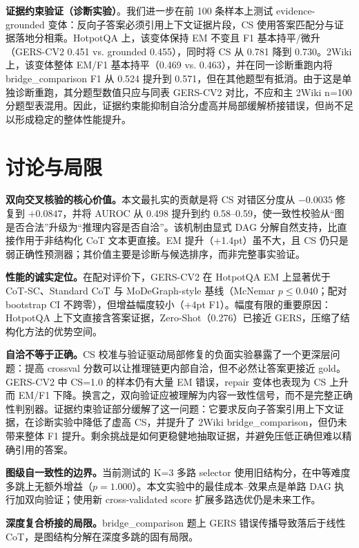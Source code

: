 \documentclass[11pt,a4paper]{ctexart}
\begin{document}
\textbf{证据约束验证（诊断实验）}。我们进一步在前 100 条样本上测试 evidence-grounded 变体：反向子答案必须引用上下文证据片段，CS 使用答案匹配分与证据落地分相乘。HotpotQA 上，该变体保持 EM 不变且 F1 基本持平/微升（GERS-CV2 0.451 vs. grounded 0.455），同时将 CS 从 0.781 降到 0.730。2Wiki 上，该变体整体 EM/F1 基本持平（0.469 vs. 0.463），并在同一诊断重跑内将 bridge\_comparison F1 从 0.524 提升到 0.571，但在其他题型有抵消。由于这是单独诊断重跑，其分题型数值只应与同表 GERS-CV2 对比，不应和主 2Wiki n=100 分题型表混用。因此，证据约束能抑制自洽分虚高并局部缓解桥接错误，但尚不足以形成稳定的整体性能提升。

\section{讨论与局限}

\textbf{双向交叉核验的核心价值。}本文最扎实的贡献是将 CS 对错区分度从 $-0.0035$ 修复到 $+0.0847$，并将 AUROC 从 0.498 提升到约 0.58--0.59，使一致性校验从``图是否合法''升级为``推理内容是否自洽''。该机制由显式 DAG 分解自然支持，比直接作用于非结构化 CoT 文本更直接。EM 提升（+1.4pt）虽不大，且 CS 仍只是弱正确性预测器；其价值主要是诊断与候选排序，而非完整事实验证。

\textbf{性能的诚实定位。}在配对评价下，GERS-CV2 在 HotpotQA EM 上显著优于 CoT-SC、Standard CoT 与 MoDeGraph-style 基线（McNemar $p\le0.040$；配对 bootstrap CI 不跨零），但增益幅度较小（+4pt F1）。幅度有限的重要原因：HotpotQA 上下文直接含答案证据，Zero-Shot（0.276）已接近 GERS，压缩了结构化方法的优势空间。

\textbf{自洽不等于正确。}CS 校准与验证驱动局部修复的负面实验暴露了一个更深层问题：提高 crossval 分数可以让推理链更内部自洽，但不必然让答案更接近 gold。GERS-CV2 中 CS=1.0 的样本仍有大量 EM 错误，repair 变体也表现为 CS 上升而 EM/F1 下降。换言之，双向验证应被理解为内容一致性信号，而不是完整正确性判别器。证据约束验证部分缓解了这一问题：它要求反向子答案引用上下文证据，在诊断实验中降低了虚高 CS，并提升了 2Wiki bridge\_comparison，但仍未带来整体 F1 提升。剩余挑战是如何更稳健地抽取证据，并避免压低正确但难以精确引用的答案。

\textbf{图级自一致性的边界。}当前测试的 K=3 多路 selector 使用旧结构分，在中等难度多跳上无额外增益（$p=1.000$）。本文实验中的最佳成本--效果点是单路 DAG 执行加双向验证；使用新 cross-validated score 扩展多路选优仍是未来工作。

\textbf{深度复合桥接的局限。}bridge\_comparison 题上 GERS 错误传播导致落后于线性 CoT，是图结构分解在深度多跳的固有局限。
\end{document}

